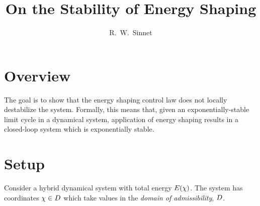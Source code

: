\documentclass[twocolumn]{article}
\author{R.~W.~Sinnet}
\title{On the Stability of Energy Shaping}
\begin{document}
\maketitle
\thispagestyle{fancy}

\section*{Overview}
The goal is to show that the energy shaping control law does not locally destabilize the system.
%
Formally, this means that, given an exponentially-stable limit cycle in a dynamical system, application of energy shaping results in a closed-loop system which is exponentially stable.

\section{Setup}

Consider a hybrid dynamical system with total energy $E(\chi)$.
%
The system has coordinates $\chi \in D$ which take values in the {\em domain of admissibility}, $D$.
\end{document}
